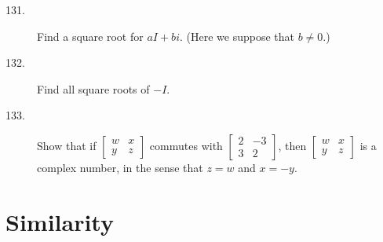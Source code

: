 \documentclass{article}
\begin{document}
\begin{description}
  \item[131.] Find a square root for $aI+bi$. (Here we suppose that $b \neq 0$.)

  \item[132.] Find all square roots of $-I$.

  \item[133.] Show that if $\begin{bmatrix} w & x \\ y & z \end{bmatrix}$ commutes with $\begin{bmatrix} 2 & -3 \\ 3 & 2 \end{bmatrix}$, then $\begin{bmatrix} w & x \\ y & z \end{bmatrix}$ is a complex number, in the sense that $z = w$ and $x = -y$.

\end{description}




\newpage

\section{Similarity}
\end{document}
